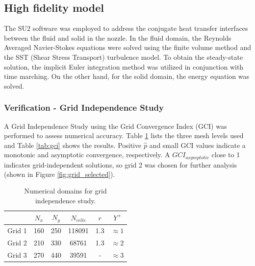 \documentclass[10pt,fleqn,a4paper,twoside]{article}
\begin{document}
\subsection{High fidelity model}

The SU2 software \citep{Economon2016} was employed to address the conjugate heat transfer interfaces between the fluid and solid in the nozzle. In the fluid domain, the Reynolds Averaged Navier-Stokes equations were solved using the finite volume method and the SST (Shear Stress Transport) turbulence model. To obtain the steady-state solution, the implicit Euler integration method was utilized in conjunction with time marching. On the other hand, for the solid domain, the energy equation was solved.

\subsubsection{Verification - Grid Independence Study}

A Grid Independence Study using the Grid Convergence Index (GCI)\cite{roache1994} was performed to assess numerical accuracy. Table \ref{tab:meshesgci} lists the three mesh levels used and Table \ref{tab:gci} shows the results. Positive $\hat{p}$ and small GCI values indicate a monotonic and asymptotic convergence, respectively. A $GCI_{asymptotic}$ close to 1 indicates grid-independent solutions, so grid 2 was chosen for further analysis (shown in Figure \ref{fig:grid_selected}).

\begin{table} [ht]
	\caption{Numerical domains for grid independence study.}
    \label{tab:meshesgci}
	\begin{center}
		\begin{tabular}{@{}l|c|c|c|c|c@{}}        
            \hline
            & $N_x$ & $N_y$ & $ N_{cells} $ & $r$ & $Y^{+}$ \\ 
            \hline%
            Grid 1 & 160 & 250 & 118091 & 1.3 & $\approx 1$\\ 
            Grid 2 & 210 & 330  & 68761 & 1.3 & $\approx 2$\\ 
            Grid 3 & 270 & 440  & 39591 & -   & $\approx 3$\\
            \hline%
		\end{tabular}
	\end{center}
\end{table}
\end{document}
